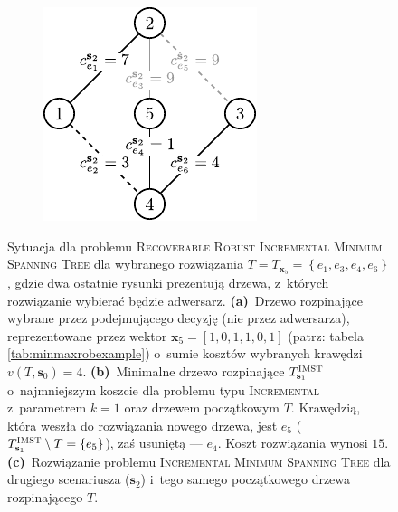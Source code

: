 \begin{figure}[!htbp]
\begin{subfigure}[b]{0.3\textwidth}
		\caption{}
		\label{fig:robincrexample:b}
	\end{subfigure}
	\hfill
	\begin{subfigure}[b]{0.3\textwidth}
		\includegraphics[width=\textwidth]{Chapter_II/ROB-INC-MST-example/c1}
		\caption{}
		\label{fig:robincrexample:c}
	\end{subfigure}
	\hfill\null
	\caption{
		Sytuacja dla problemu \textsc{Recoverable Robust Incremental Minimum Spanning Tree} dla wybranego rozwiązania $T = T_{\textbf{x}_{5}} = \left\{ e_{1}, e_{3}, e_{4}, e_{6} \right\}$, gdzie dwa ostatnie rysunki prezentują drzewa, z~których rozwiązanie wybierać będzie adwersarz.
		\textbf{(a)}~Drzewo rozpinające wybrane przez podejmującego decyzję (nie przez adwersarza), reprezentowane przez wektor $\textbf{x}_{5} = \left[ 1, 0, 1, 1, 0, 1 \right]$ (patrz: tabela \ref{tab:minmaxrobexample}) o~sumie kosztów wybranych krawędzi $v \left( T, \textbf{s}_{0} \right) = 4$.
		\textbf{(b)}~Minimalne drzewo rozpinające $T^{\textsc{IMST}}_{\textbf{s}_{1}}$ o~najmniejszym koszcie dla problemu typu \textsc{Incremental} z~parametrem $k = 1$ oraz drzewem początkowym $T$.
		Krawędzią, która weszła do rozwiązania nowego drzewa, jest $e_{5}$ ($T^{\textsc{IMST}}_{\textbf{s}_{1}} \setminus T = \left\{ e_{5} \right\}$), zaś usuniętą --- $e_{4}$.
		Koszt rozwiązania wynosi $15$.
		\textbf{(c)}~Rozwiązanie problemu \textsc{Incremental Minimum Spanning Tree} dla drugiego scenariusza ($\textbf{s}_{2}$) i~tego samego początkowego drzewa rozpinającego $T$.
}
\end{figure}
